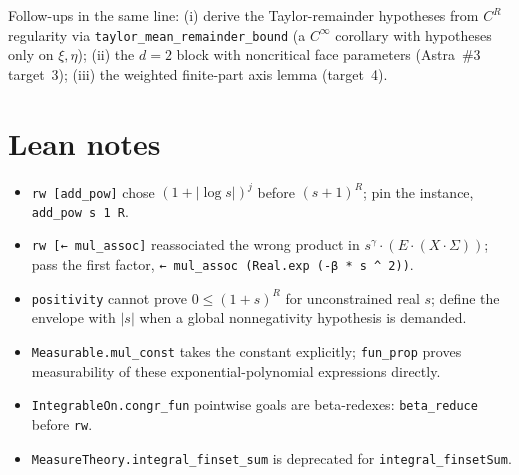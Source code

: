 \documentclass[11pt]{article}
\begin{document}
Follow-ups in the same line: (i) derive the Taylor-remainder hypotheses from $C^R$ regularity via
\texttt{taylor\_mean\_remainder\_bound} (a $C^\infty$ corollary with hypotheses only on $\xi,\eta$);
(ii) the $d=2$ block with noncritical face parameters (Astra~\#3 target~3); (iii) the weighted
finite-part axis lemma (target~4).

\section{Lean notes}

\begin{itemize}
\item \texttt{rw [add\_pow]} chose $(1+|\log s|)^j$ before $(s+1)^R$; pin the instance,
\texttt{add\_pow s 1 R}.
\item \texttt{rw [← mul\_assoc]} reassociated the wrong product in
$s^\gamma\cdot(E\cdot(X\cdot\Sigma))$; pass the first factor,
\texttt{← mul\_assoc (Real.exp (-β * s \^{} 2))}.
\item \texttt{positivity} cannot prove $0\le(1+s)^R$ for unconstrained real $s$; define the
envelope with $|s|$ when a global nonnegativity hypothesis is demanded.
\item \texttt{Measurable.mul\_const} takes the constant explicitly; \texttt{fun\_prop} proves
measurability of these exponential-polynomial expressions directly.
\item \texttt{IntegrableOn.congr\_fun} pointwise goals are beta-redexes: \texttt{beta\_reduce}
before \texttt{rw}.
\item \texttt{MeasureTheory.integral\_finset\_sum} is deprecated for \texttt{integral\_finsetSum}.
\end{itemize}
\end{document}
